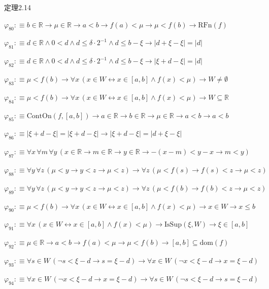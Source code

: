 \begin{fullproof}{定理2.14}
\begin{abbrevlist}
\item $\varphi_{80} :\equiv b \in \mathbb{R} \to \mu \in \mathbb{R} \to a < b \to f(a) < \mu \to \mu < f(b) \to \mathrm{RFn}(f)$
\item $\varphi_{81} :\equiv d \in \mathbb{R} \land 0 < d \land d \leq \delta \cdot 2^{-1} \land d \leq b - \xi \to \lvert d + \xi - \xi \rvert = \lvert d \rvert$
\item $\varphi_{82} :\equiv d \in \mathbb{R} \land 0 < d \land d \leq \delta \cdot 2^{-1} \land d \leq b - \xi \to \lvert \xi + d - \xi \rvert = \lvert d \rvert$
\item $\varphi_{83} :\equiv \mu < f(b) \to \forall x\,(x \in W \leftrightarrow x \in [a,b] \land f(x) < \mu) \to W \neq \emptyset$
\item $\varphi_{84} :\equiv \mu < f(b) \to \forall x\,(x \in W \leftrightarrow x \in [a,b] \land f(x) < \mu) \to W \subseteq \mathbb{R}$
\item $\varphi_{85} :\equiv \mathrm{ContOn}(f,[a,b]) \to a \in \mathbb{R} \to b \in \mathbb{R} \to \mu \in \mathbb{R} \to a < b \to a < b$
\item $\varphi_{86} :\equiv \lvert \xi + d - \xi \rvert = \lvert \xi + d - \xi \rvert \to \lvert \xi + d - \xi \rvert = \lvert d + \xi - \xi \rvert$
\item $\varphi_{87} :\equiv \forall x\,\forall m\,\forall y\,(x \in \mathbb{R} \to m \in \mathbb{R} \to y \in \mathbb{R} \to -(x - m) < y - x \to m < y)$
\item $\varphi_{88} :\equiv \forall y\,\forall z\,(\mu < y \to y < z \to \mu < z) \to \forall z\,(\mu < f(s) \to f(s) < z \to \mu < z)$
\item $\varphi_{89} :\equiv \forall y\,\forall z\,(\mu < y \to y < z \to \mu < z) \to \forall z\,(\mu < f(b) \to f(b) < z \to \mu < z)$
\item $\varphi_{90} :\equiv \mu < f(b) \to \forall x\,(x \in W \leftrightarrow x \in [a,b] \land f(x) < \mu) \to x \in W \to x \leq b$
\item $\varphi_{91} :\equiv \forall x\,(x \in W \leftrightarrow x \in [a,b] \land f(x) < \mu) \to \mathrm{IsSup}(\xi,W) \to \xi \in [a,b]$
\item $\varphi_{92} :\equiv \mu \in \mathbb{R} \to a < b \to f(a) < \mu \to \mu < f(b) \to [a,b] \subseteq \mathrm{dom}(f)$
\item $\varphi_{93} :\equiv \forall s \in W\,(\neg s < \xi - d \to s = \xi - d) \to \forall x \in W\,(\neg x < \xi - d \to x = \xi - d)$
\item $\varphi_{94} :\equiv \forall x \in W\,(\neg x < \xi - d \to x = \xi - d) \to \forall s \in W\,(\neg s < \xi - d \to s = \xi - d)$

\end{abbrevlist}
\end{fullproof}
